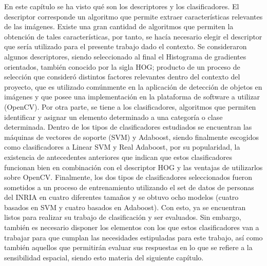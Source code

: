 En este capítulo se ha visto qué son los descriptores y los clasificadores. El descriptor corresponde un algoritmo que permite extraer características relevantes de las imágenes. Existe una gran cantidad de algoritmos que permiten la obtención de tales características, por tanto, se hacía necesario elegir el descriptor que sería utilizado para el presente trabajo dado el contexto. Se consideraron algunos descriptores, siendo seleccionado al final el Histograma de gradientes orientados, también conocido por la sigla HOG; producto de un proceso de selección que consideró distintos factores relevantes dentro del contexto del proyecto, que es utilizado comúnmente en la aplicación de detección de objetos en imágenes y que posee una implementación en la plataforma de software a utilizar (OpenCV).
Por otra parte, se tiene a los clasificadores, algoritmos que permiten identificar y asignar un elemento determinado a una categoría  o clase determinada. Dentro de los tipos de clasificadores estudiados se encuentran las máquinas de vectores de soporte (SVM) y Adaboost, siendo finalmente escogidos como clasificadores a Linear SVM y Real Adaboost, por su popularidad, la existencia de antecedentes anteriores que indican que estos clasificadores funcionan bien en combinación con el descriptor HOG y las ventajas de utilizarlos sobre OpenCV.
Finalmente, los dos tipos de clasificadores seleccionados fueron sometidos a un proceso de entrenamiento utilizando el set de datos de personas del INRIA en cuatro diferentes tamaños y se obtuvo ocho modelos (cuatro basados en SVM y cuatro basados en Adaboost). Con esto, ya se encuentran listos para realizar su trabajo de clasificación y ser evaluados. Sin embargo, también es necesario disponer los elementos con los que estos clasificadores van a trabajar para que cumplan las necesidades estipuladas para este trabajo, así como también aquellos que permitirán evaluar sus respuestas en lo que se refiere a la sensibilidad espacial, siendo esto materia del siguiente capítulo.

